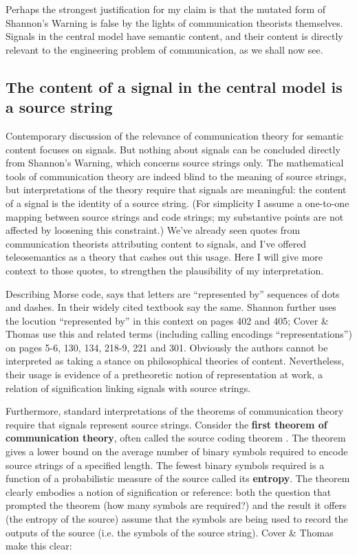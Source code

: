 \documentclass[12pt]{article}
\begin{document}
Perhaps the strongest justification for my claim is that the mutated form of {\sc Shannon's Warning} is false by the lights of communication theorists themselves.
Signals in the central model have semantic content, and their content is directly relevant to the engineering problem of communication, as we shall now see.


\subsection{The content of a signal in the central model is a source string}\label{subsec:signalContent}

Contemporary discussion of the relevance of communication theory for semantic content focuses on signals.
But nothing about signals can be concluded directly from {\sc Shannon's Warning}, which concerns source strings only.
The mathematical tools of communication theory are indeed blind to the meaning of source strings, but interpretations of the theory require that signals are meaningful: the content of a signal is the identity of a source string.
(For simplicity I assume a one-to-one mapping between source strings and code strings; my substantive points are not affected by loosening this constraint.)
We've already seen quotes from communication theorists attributing content to signals, and I've offered teleosemantics as a theory that cashes out this usage.
Here I will give more context to those quotes, to strengthen the plausibility of my interpretation.

Describing Morse code, \citet[385]{shannon1948mathematicalc} says that letters are ``represented by'' sequences of dots and dashes.
In their widely cited textbook \citet[105]{cover2006elements} say the same.
Shannon further uses the locution ``represented by'' in this context on pages 402 and 405; Cover \& Thomas use this and related terms (including calling encodings ``representations'') on pages 5-6, 130, 134, 218-9, 221 and 301.
Obviously the authors cannot be interpreted as taking a stance on philosophical theories of content.
Nevertheless, their usage is evidence of a pretheoretic notion of representation at work, a relation of signification linking signals with source strings.

Furthermore, standard interpretations of the theorems of communication theory require that signals represent source strings.
Consider the \textbf{first theorem of communication theory}, often called the source coding theorem \citep[$\S$5]{cover2006elements} \citep[$\S$4]{mackay2003information}.
The theorem gives a lower bound on the average number of binary symbols required to encode source strings of a specified length.
The fewest binary symbols required is a function of a probabilistic measure of the source called its \textbf{entropy}.
The theorem clearly embodies a notion of signification or reference: both the question that prompted the theorem (how many symbols are required?) and the result it offers (the entropy of the source) assume that the symbols are being used to record the outputs of the source (i.e. the symbols of the source string).
Cover \& Thomas make this clear:
\end{document}
